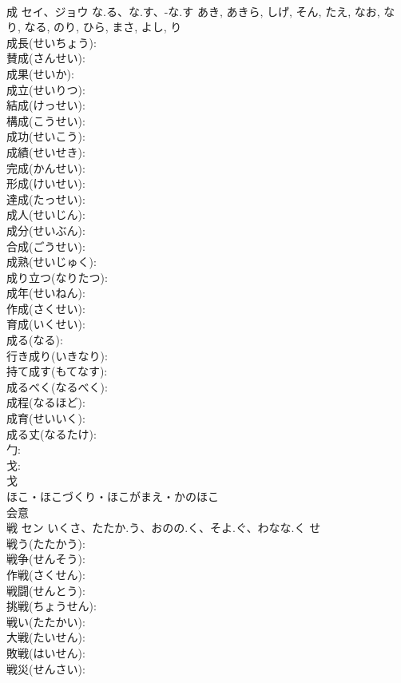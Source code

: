 \documentclass[8pt]{extreport}
\begin{document}
\begin{CJK}{UTF8}{min}
\\	成	セイ、ジョウ	な.る、な.す、-な.す	あき, あきら, しげ, そん, たえ, なお, なり, なる, のり, ひら, まさ, よし, り	
\\	成長(せいちょう): 
\\	賛成(さんせい): 
\\	成果(せいか): 
\\	成立(せいりつ): 
\\	結成(けっせい): 
\\	構成(こうせい): 
\\	成功(せいこう): 
\\	成績(せいせき): 
\\	完成(かんせい): 
\\	形成(けいせい): 
\\	達成(たっせい): 
\\	成人(せいじん): 
\\	成分(せいぶん): 
\\	合成(ごうせい): 
\\	成熟(せいじゅく): 
\\	成り立つ(なりたつ): 
\\	成年(せいねん): 
\\	作成(さくせい): 
\\	育成(いくせい): 
\\	成る(なる): 
\\	行き成り(いきなり): 
\\	持て成す(もてなす): 
\\	成るべく(なるべく): 
\\	成程(なるほど): 
\\	成育(せいいく): 
\\	成る丈(なるたけ): 
\\	勹: 
\\	戈: 
\\	戈	
\\	ほこ・ほこづくり・ほこがまえ・かのほこ	
\\	会意 
\\	戦	セン	いくさ、たたか.う、おのの.く、そよ.ぐ、わなな.く	せ	
\\	戦う(たたかう): 
\\	戦争(せんそう): 
\\	作戦(さくせん): 
\\	戦闘(せんとう): 
\\	挑戦(ちょうせん): 
\\	戦い(たたかい): 
\\	大戦(たいせん): 
\\	敗戦(はいせん): 
\\	戦災(せんさい): 

\end{CJK}
\end{document}
